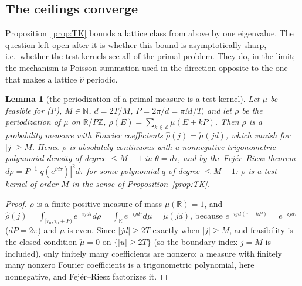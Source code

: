 \documentclass[11pt]{amsart}
\newtheorem{lemma}[theorem]{Lemma}
\theoremstyle{definition}
\theoremstyle{remark}
\newcommand{\R}{\mathbb R}
\newcommand{\N}{\mathbb N}
\newcommand{\Z}{\mathbb Z}
\newcommand{\nuh}{\widehat\nu}
\begin{document}
\subsection{The ceilings converge}\label{subsec:R}
Proposition~\ref{prop:TK} bounds a lattice class from above by one eigenvalue. The question left
open after it is whether this bound is asymptotically sharp, i.e.\ whether the test kernels see all
of the primal problem. They do, in the limit; the mechanism is Poisson summation used in the
direction opposite to the one that makes a lattice $\nuh$ periodic.

\begin{lemma}[the periodization of a primal measure is a test kernel]\label{lem:R1}
Let $\mu$ be feasible for \textup{(P)}, $M\in\N$, $d=2T/M$, $P=2\pi/d=\pi M/T$, and let $\rho$ be the
periodization of $\mu$ on $\R/P\Z$, $\rho(E)=\sum_{k\in\Z}\mu(E+kP)$. Then $\rho$ is a probability
measure with Fourier coefficients $\widehat\rho(j)=\check\mu(jd)$, which vanish for $|j|\ge M$. Hence
$\rho$ is absolutely continuous with a nonnegative trigonometric polynomial density of degree
$\le M-1$ in $\theta=d\tau$, and by the Fej\'er--Riesz theorem
$d\rho=P^{-1}|q(e^{id\tau})|^2d\tau$ for some polynomial $q$ of degree $\le M-1$: $\rho$ is a test
kernel of order $M$ in the sense of Proposition~\ref{prop:TK}.
\end{lemma}
\begin{proof}
$\rho$ is a finite positive measure of mass $\mu(\R)=1$, and
$\widehat\rho(j)=\int_{[\tau_0,\tau_0+P)}e^{-ijd\tau}d\rho=\int_\R e^{-ijd\tau}d\mu=\check\mu(jd)$,
because $e^{-ijd(\tau+kP)}=e^{-ijd\tau}$ ($dP=2\pi$) and $\mu$ is even. Since $|jd|\ge2T$ exactly when
$|j|\ge M$, and feasibility is the closed condition $\check\mu=0$ on $\{|u|\ge2T\}$ (so the boundary
index $j=M$ is included), only finitely many coefficients are nonzero; a measure with finitely many
nonzero Fourier coefficients is a trigonometric polynomial, here nonnegative, and Fej\'er--Riesz
factorizes it.
\end{proof}
\end{document}

